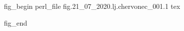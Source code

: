  
 

\ifcmt
fig_begin
	perl_file fig.21_07_2020.lj.chervonec_001.1
	tex \caption{\sectitle}
fig_end
\fi

